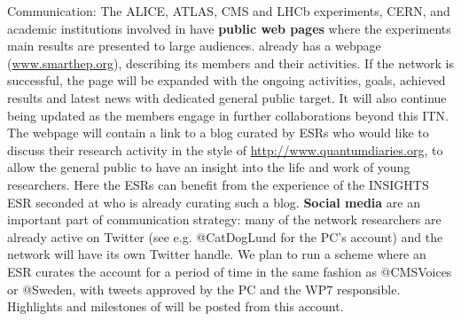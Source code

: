 \color{blue}Communication: \color{black} 
The ALICE, ATLAS, CMS and LHCb experiments, CERN, and academic institutions involved in \acronym have \textbf{public web pages} where the experiments main results are presented to large audiences. 
\acronym already has a webpage (\url{www.smarthep.org}), describing its members and their activities. 
If the network is successful, the page will be expanded with the ongoing activities, goals, achieved results and latest news with dedicated general public target. 
It will also continue being updated as the members engage in further collaborations beyond this ITN. 
The webpage will contain a link to a blog  curated by ESRs who would like to discuss their research activity in the style of \href{http://www.quantumdiaries.org}{http://www.quantumdiaries.org}, to allow the general public to have an insight into the life and work of young researchers. 
Here the ESRs can benefit from the experience of the INSIGHTS ESR seconded at \lundentity who is already curating such a blog. 
\textbf{Social media} are an important part of \acronym communication strategy: many of the network researchers are already active on Twitter (see e.g. @CatDogLund for the PC's account) and the network will have its own Twitter handle. 
We plan to run a scheme where an ESR curates the account for a period of time in the same fashion as @CMSVoices or @Sweden, with tweets approved by the PC and the WP7 responsible. 
Highlights and milestones of \acronym will be posted from this account. 
